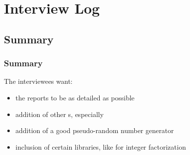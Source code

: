 \section{Interview Log}


\subsection{Summary}

\begin{frame}
\frametitle{Summary}
The interviewees want:
\begin{itemize}
\item the \cs{} reports to be as detailed as possible
\item addition of other \ca s, especially \aes
\item addition of a good pseudo-random number generator
\item inclusion of certain libraries, like 
  for integer factorization
\end{itemize}
\end{frame}

